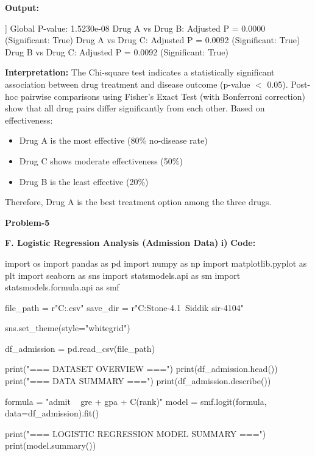 \documentclass[12pt,a4paper]{article}
\begin{document}
\textbf{Output:}
\begin{codebox}
[[40 10]
 [10 40]
 [25 25]]
Global P-value: 1.5230e-08
Drug A vs Drug B: Adjusted P = 0.0000 (Significant: True)
Drug A vs Drug C: Adjusted P = 0.0092 (Significant: True)
Drug B vs Drug C: Adjusted P = 0.0092 (Significant: True)
\end{codebox}

\textbf{Interpretation:}
The Chi-square test indicates a statistically significant association between drug treatment and disease outcome (p-value $<$ 0.05).
Post-hoc pairwise comparisons using Fisher’s Exact Test (with Bonferroni correction) show that all drug pairs differ significantly from each other.
Based on effectiveness:
\begin{itemize}
\item Drug A is the most effective (80\% no-disease rate)
\item Drug C shows moderate effectiveness (50\%)
\item Drug B is the least effective (20\%)
\end{itemize}
Therefore, Drug A is the best treatment option among the three drugs.

\begin{center}
\Large \textbf{Problem-5}
\end{center}
\textbf{F. Logistic Regression Analysis (Admission Data)}
\textbf{i)}
\textbf{Code:}
\begin{codebox}
import os
import pandas as pd
import numpy as np
import matplotlib.pyplot as plt
import seaborn as sns
import statsmodels.api as sm
import statsmodels.formula.api as smf


file_path = r"C:\Users\hp\Downloads\binary.csv"
save_dir = r"C:\Users\hp\OneDrive\Desktop\Reality Stone-4.1\
Siddik sir-4104"


sns.set_theme(style="whitegrid")


df_admission = pd.read_csv(file_path)

print("=== DATASET OVERVIEW ===")
print(df_admission.head())
print("\n=== DATA SUMMARY ===")
print(df_admission.describe())


formula = "admit ~ gre + gpa + C(rank)"
model = smf.logit(formula, data=df_admission).fit()

print("\n=== LOGISTIC REGRESSION MODEL SUMMARY ===")
print(model.summary())
\end{codebox}
\end{document}
